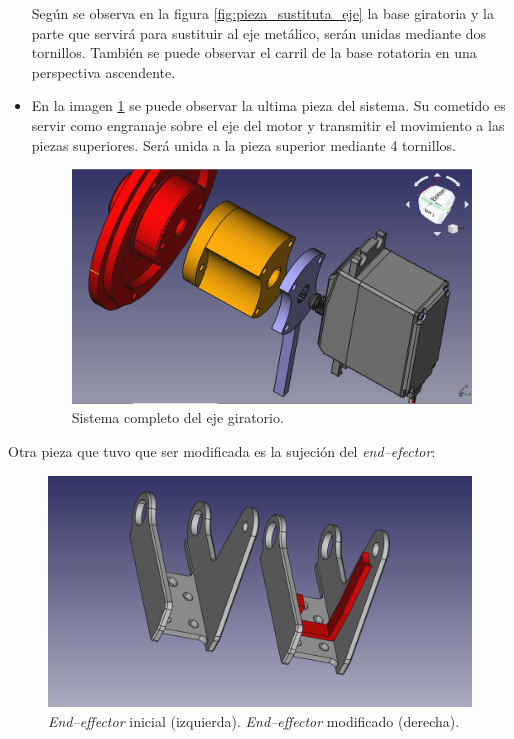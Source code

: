 \begin{itemize}
    Según se observa en la figura \ref{fig:pieza_sustituta_eje} la base giratoria y la parte que servirá para sustituir al eje metálico, serán unidas mediante dos tornillos.
    También se puede observar el carril de la base rotatoria en una perspectiva ascendente.

    \item En la imagen \ref{fig:sistema_completo_eje} se puede observar la ultima pieza del sistema. Su cometido es servir como engranaje sobre el eje del motor y transmitir el movimiento a las piezas superiores.
    Será unida a la pieza superior mediante 4 tornillos.

    \begin{figure}[H]
        \centering
        \includegraphics[width=.9\linewidth]{pictures/CadenaCineticaDelEje.png}
        \caption{Sistema completo del eje giratorio.}
        \label{fig:sistema_completo_eje}
    \end{figure}
\end{itemize}

Otra pieza que tuvo que ser modificada es la sujeción del \textit{end--efector}:

\begin{figure}[H]
    \centering
    \includegraphics[width=.9\linewidth]{pictures/EndEffectorModificado.png}
    \caption{\textit{End--effector} inicial (izquierda). \textit{End--effector} modificado (derecha).}
    \label{fig:end_effector_modificado}
\end{figure}

